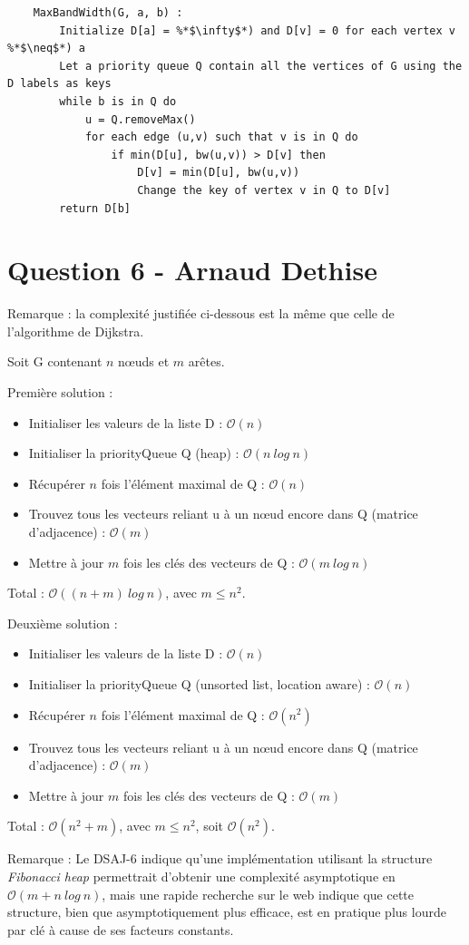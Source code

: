 \documentclass[10pt,a4paper]{article}
\begin{document}
	\begin{lstlisting}
	MaxBandWidth(G, a, b) :
		Initialize D[a] = %*$\infty$*) and D[v] = 0 for each vertex v %*$\neq$*) a
		Let a priority queue Q contain all the vertices of G using the D labels as keys
		while b is in Q do
			u = Q.removeMax()
			for each edge (u,v) such that v is in Q do
				if min(D[u], bw(u,v)) > D[v] then
					D[v] = min(D[u], bw(u,v))
					Change the key of vertex v in Q to D[v]
		return D[b]
	\end{lstlisting}

\section*{Question 6 - Arnaud Dethise}

	Remarque : la complexité justifiée ci-dessous est la même que celle de l'algorithme de Dijkstra.

	Soit G contenant $n$ nœuds et $m$ arêtes.
	
	\vspace{0.3cm}
	Première solution :
	\begin{itemize}
	\item Initialiser les valeurs de la liste D : $\mathcal{O}(n)$
	\item Initialiser la priorityQueue Q (heap) : $\mathcal{O}(n~log~n)$
	\item Récupérer $n$ fois l'élément maximal de Q : $\mathcal{O}(n)$
	\item Trouvez tous les vecteurs reliant u à un nœud encore dans Q (matrice d'adjacence) : $\mathcal{O}(m)$
	\item Mettre à jour $m$ fois les clés des vecteurs de Q : $\mathcal{O}(m~log~n)$
	\end{itemize}
	Total : $\mathcal{O}((n+m)~log~n)$, avec $m \leq n^2$.
	
	\vspace{0.3cm}	
	Deuxième solution :
	\begin{itemize}
	\item Initialiser les valeurs de la liste D : $\mathcal{O}(n)$
	\item Initialiser la priorityQueue Q (unsorted list, location aware) : $\mathcal{O}(n)$
	\item Récupérer $n$ fois l'élément maximal de Q : $\mathcal{O}(n^2)$
	\item Trouvez tous les vecteurs reliant u à un nœud encore dans Q (matrice d'adjacence) : $\mathcal{O}(m)$
	\item Mettre à jour $m$ fois les clés des vecteurs de Q : $\mathcal{O}(m)$
	\end{itemize}
	Total : $\mathcal{O}(n^2 + m)$, avec $m \leq n^2$, soit $\mathcal{O}(n^2)$.
	
	\vspace{0.5cm}
	Remarque : Le DSAJ-6 indique qu'une implémentation utilisant la structure \textit{Fibonacci heap} permettrait d'obtenir une complexité asymptotique en $\mathcal{O}(m + n~log~n)$, mais une rapide recherche sur le web indique que cette structure, bien que asymptotiquement plus efficace, est en pratique plus lourde par clé à cause de ses facteurs constants.

\end{document}
